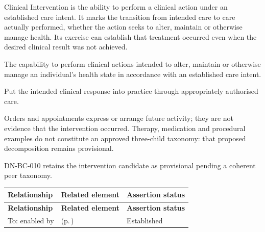 Clinical Intervention is the ability to perform a clinical action under an established care intent. It marks the transition from intended care to care actually performed, whether the action seeks to alter, maintain or otherwise manage health. Its exercise can establish that treatment occurred even when the desired clinical result was not achieved.



The capability to perform clinical actions intended to alter, maintain or otherwise manage an individual's health state in accordance with an established care intent.



Put the intended clinical response into practice through appropriately authorised care.



Orders and appointments express or arrange future activity; they are not evidence that the intervention occurred. Therapy, medication and procedural examples do not constitute an approved three-child taxonomy: that proposed decomposition remains provisional.



DN-BC-010 retains the intervention candidate as provisional pending a coherent peer taxonomy.


\begingroup\small\setlength{\TableWidth}{\dimexpr\linewidth-6\tabcolsep-4\arrayrulewidth\relax}
\begin{longtable}{|>{\raggedright\arraybackslash}p{0.27\TableWidth}|>{\raggedright\arraybackslash}p{0.48\TableWidth}|>{\raggedright\arraybackslash}p{0.25\TableWidth}|}
\hline\rowcolor{TableHead}\textbf{Relationship} & \textbf{Related element} & \textbf{Assertion status}\\\hline\endfirsthead
\hline\rowcolor{TableHead}\textbf{Relationship} & \textbf{Related element} & \textbf{Assertion status}\\\hline\endhead
\hline\endfoot
To: enabled by & \nameref{cap:bec-health-information-access} (p.\,\pageref{cap:bec-health-information-access}) & Established\\\hline
\end{longtable}\endgroup

